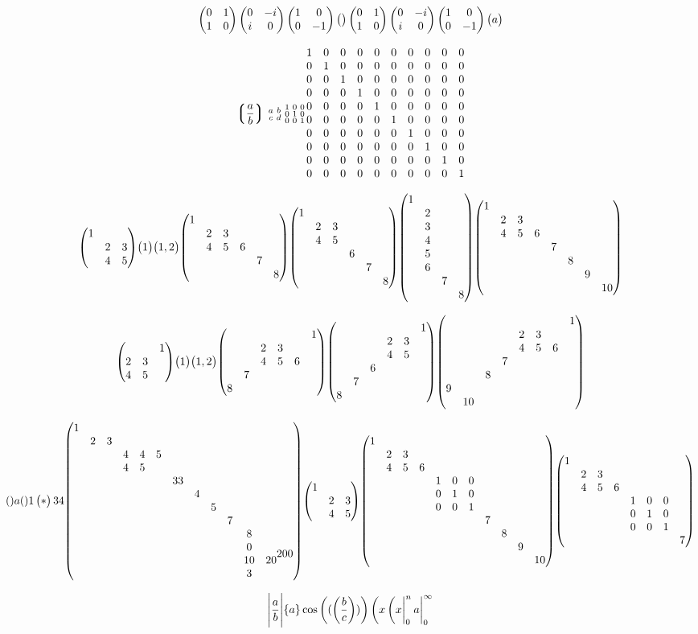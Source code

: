\documentclass{article}
\begin{document}
\[
  \pmqty{\pmat{1}}
  \pmqty{\pmat{2}}
  \pmqty{\pmat{3}}
  \pmqty{\pmat{4}}
  \pmqty{\pmat{x}}
  \pmqty{\pmat{y}}
  \pmqty{\pmat{z}}
  \pmqty{\pmat{aa}}
\]


\[
  \left\lgroup\frac{a}{b}\right\rgroup
  \begin{smallmatrix} a & b \\ c & d \end{smallmatrix}
  \smqty{\imat{3}}
  \mqty{\imat{10}}
\]

\[
  \mqty(\dmat{1,2&3\\4&5})
  \mqty(\dmat 1)
  \mqty(\dmat 1,2)
  \mqty(\dmat{1,2&3\\4&5&6,7,8})
  \mqty(\dmat{1,2&3\\4&5,6,7,8})
  \mqty(\dmat{1,2\\3\\4\\5\\6,7,8})
  \mqty(\dmat{1,2&3\\4&5&6,7,8,\dmat{9,10}})
\]


\[
  \mqty(\admat{1,2&3\\4&5})
  \mqty(\admat 1)
  \mqty(\admat 1,2)
  \mqty(\admat{1,2&3\\4&5&6,7,8})
  \mqty(\admat{1,2&3\\4&5,6,7,8})
  \mqty(\admat{1,2&3\\4&5&6,7,8,\dmat{9,10}})
\]

\[ 
  \mqty a
  \mqty1
  \pmqty* 34
  \mqty(\dmat{1,2&3,4&4&5\\4&5,33,4,5,7,8\\0\\10&20\\3,200}) 
  \mqty(\dmat{1,2&3\\4&5}) 
  \mqty(\dmat{1,2&3\\4&5&6,\imat{3},7,8,\dmat{9,10}})
  \mqty(\mqty{1}\\ & \mqty{2 & 3\\ 4 & 5 & 6}\\ & & \mqty{\imat{3}} \\ & & & \mqty{7})
\]

\newpage

\[\qty\Bigg|\frac{a}{b}|
  \qty{a}\cos
  \qty((\qty(\frac{b}{c})))
  \eval(x\eval(x|_0^n a |_0^\infty 
\]
\end{document}
